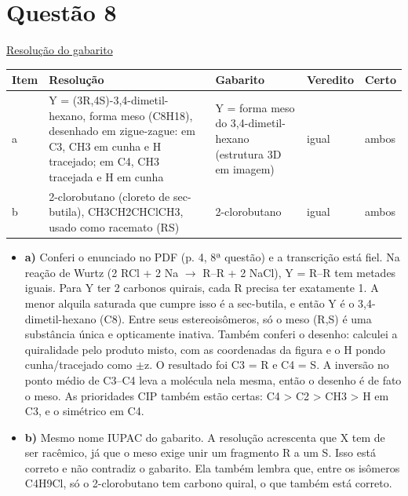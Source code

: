 \documentclass{article}%
\begin{document}
\section*{Questão 8}%
\href{https://poliedroresolve.sistemapoliedro.com.br/vestibulares/ime/2027/ime-2-fase-dia-3-28-10-2026-2-fase-dia-3/dissertativa-8-quimica-2-fase-dia-3-ime-2027}{Resolução do gabarito}\par\smallskip%
\begin{longtable}{@{}p{} p{} p{} p{} p{}@{}}\toprule Item & Resolução & Gabarito & Veredito & Certo \\ \midrule
a & Y = (3R,4S){-}3,4{-}dimetil{-}hexano, forma meso (C8H18), desenhado em zigue{-}zague: em C3, CH3 em cunha e H tracejado; em C4, CH3 tracejada e H em cunha & Y = forma meso do 3,4{-}dimetil{-}hexano (estrutura 3D em imagem) & igual & ambos \\
b & 2{-}clorobutano (cloreto de sec{-}butila), CH3CH2CHClCH3, usado como racemato (RS) & 2{-}clorobutano & igual & ambos \\
\bottomrule\end{longtable}%
\begin{itemize}%
\item%
\textbf{a)} Conferi o enunciado no PDF (p. 4, 8ª questão) e a transcrição está fiel. Na reação de Wurtz (2 RCl + 2 Na $\to$ R--R + 2 NaCl), Y = R--R tem metades iguais. Para Y ter 2 carbonos quirais, cada R precisa ter exatamente 1. A menor alquila saturada que cumpre isso é a sec{-}butila, e então Y é o 3,4{-}dimetil{-}hexano (C8). Entre seus estereoisômeros, só o meso (R,S) é uma substância única e opticamente inativa. Também conferi o desenho: calculei a quiralidade pelo produto misto, com as coordenadas da figura e o H pondo cunha/tracejado como $\pm$z. O resultado foi C3 = R e C4 = S. A inversão no ponto médio de C3--C4 leva a molécula nela mesma, então o desenho é de fato o meso. As prioridades CIP também estão certas: C4 > C2 > CH3 > H em C3, e o simétrico em C4.%
\item%
\textbf{b)} Mesmo nome IUPAC do gabarito. A resolução acrescenta que X tem de ser racêmico, já que o meso exige unir um fragmento R a um S. Isso está correto e não contradiz o gabarito. Ela também lembra que, entre os isômeros C4H9Cl, só o 2{-}clorobutano tem carbono quiral, o que também está correto.%
\end{itemize}%
\end{document}
